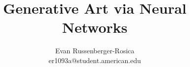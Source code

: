 \documentclass{beamer}
\begin{document}
\graphicspath{{figures/}} %

\usecaptiontemplate{\small\structure{\insertcaptionname~\insertcaptionnumber: }\insertcaption} %


\title{\huge Generative Art via Neural Networks} %

\author{Evan Russenberger-Rosica  \texorpdfstring{\\}{} er1093a@student.american.edu} %








\newcommand{\leftfoot}{bit.do/poster-PDP093} %

\newcommand{\rightfoot}{PDP-093/SKPP/III/2018} %

\end{document}
